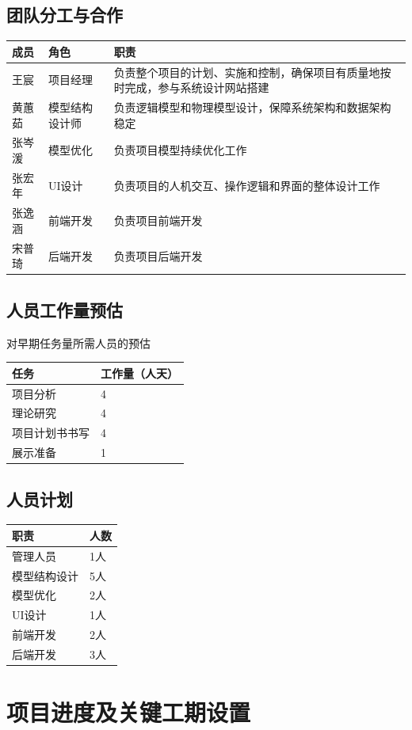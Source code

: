 \documentclass[
  hyperref, a4paper]{ctexart}
\begin{document}
\hypertarget{ux56e2ux961fux5206ux5de5ux4e0eux5408ux4f5c}{%
\subsection{团队分工与合作}\label{ux56e2ux961fux5206ux5de5ux4e0eux5408ux4f5c}}

\begin{longtable}[]{@{}lll@{}}
\toprule
成员 & 角色 & 职责\tabularnewline
\midrule
\endhead
王宸 & 项目经理 &
负责整个项目的计划、实施和控制，确保项目有质量地按时完成，参与系统设计网站搭建\tabularnewline
黄蕙茹 & 模型结构设计师 &
负责逻辑模型和物理模型设计，保障系统架构和数据架构稳定\tabularnewline
张岑湲 & 模型优化 & 负责项目模型持续优化工作\tabularnewline
张宏年 & UI设计 &
负责项目的人机交互、操作逻辑和界面的整体设计工作\tabularnewline
张逸涵 & 前端开发 & 负责项目前端开发\tabularnewline
宋普琦 & 后端开发 & 负责项目后端开发\tabularnewline
\bottomrule
\end{longtable}

\hypertarget{ux4ebaux5458ux5de5ux4f5cux91cfux9884ux4f30}{%
\subsection{人员工作量预估}\label{ux4ebaux5458ux5de5ux4f5cux91cfux9884ux4f30}}

对早期任务量所需人员的预估

\begin{longtable}[]{@{}ll@{}}
\toprule
任务 & 工作量（人天）\tabularnewline
\midrule
\endhead
项目分析 & 4\tabularnewline
理论研究 & 4\tabularnewline
项目计划书书写 & 4\tabularnewline
展示准备 & 1\tabularnewline
\bottomrule
\end{longtable}

\hypertarget{ux4ebaux5458ux8ba1ux5212}{%
\subsection{人员计划}\label{ux4ebaux5458ux8ba1ux5212}}

\begin{longtable}[]{@{}ll@{}}
\toprule
职责 & 人数\tabularnewline
\midrule
\endhead
管理人员 & 1人\tabularnewline
模型结构设计 & 5人\tabularnewline
模型优化 & 2人\tabularnewline
UI设计 & 1人\tabularnewline
前端开发 & 2人\tabularnewline
后端开发 & 3人\tabularnewline
\bottomrule
\end{longtable}

\hypertarget{ux9879ux76eeux8fdbux5ea6ux53caux5173ux952eux5de5ux671fux8bbeux7f6e}{%
\section{项目进度及关键工期设置}\label{ux9879ux76eeux8fdbux5ea6ux53caux5173ux952eux5de5ux671fux8bbeux7f6e}}
\end{document}
